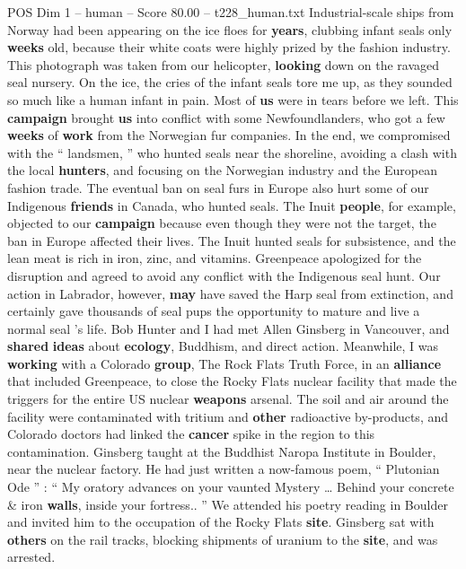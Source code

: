 \begin{textsample}{POS Dim 1 – human – Score 80.00 – t228\_human.txt}
Industrial-scale ships from Norway had been appearing on the ice floes for \textbf{years}, clubbing infant seals only \textbf{weeks} old, because their white coats were highly prized by the fashion industry.
This photograph was taken from our helicopter, \textbf{looking} down on the ravaged seal nursery.
On the ice, the cries of the infant seals tore me up, as they sounded so much like a human infant in pain.
Most of \textbf{us} were in tears before we left.
This \textbf{campaign} brought \textbf{us} into conflict with some Newfoundlanders, who got a few \textbf{weeks} of \textbf{work} from the Norwegian fur companies.
In the end, we compromised with the “ landsmen, ” who hunted seals near the shoreline, avoiding a clash with the local \textbf{hunters}, and focusing on the Norwegian industry and the European fashion trade.
The eventual ban on seal furs in Europe also hurt some of our Indigenous \textbf{friends} in Canada, who hunted seals.
The Inuit \textbf{people}, for example, objected to our \textbf{campaign} because even though they were not the target, the ban in Europe affected their lives.
The Inuit hunted seals for subsistence, and the lean meat is rich in iron, zinc, and vitamins.
Greenpeace apologized for the disruption and agreed to avoid any conflict with the Indigenous seal hunt.
Our action in Labrador, however, \textbf{may} have saved the Harp seal from extinction, and certainly gave thousands of seal pups the opportunity to mature and live a normal seal ’s life.
Bob Hunter and I had met Allen Ginsberg in Vancouver, and \textbf{shared} \textbf{ideas} about \textbf{ecology}, Buddhism, and direct action.
Meanwhile, I was \textbf{working} with a Colorado \textbf{group}, The Rock Flats Truth Force, in an \textbf{alliance} that included Greenpeace, to close the Rocky Flats nuclear facility that made the triggers for the entire US nuclear \textbf{weapons} arsenal.
The soil and air around the facility were contaminated with tritium and \textbf{other} radioactive by-products, and Colorado doctors had linked the \textbf{cancer} spike in the region to this contamination.
Ginsberg taught at the Buddhist Naropa Institute in Boulder, near the nuclear factory.
He had just written a now-famous poem, “ Plutonian Ode ” : “ My oratory advances on your vaunted Mystery … Behind your concrete \& iron \textbf{walls}, inside your fortress.. ” We attended his poetry reading in Boulder and invited him to the occupation of the Rocky Flats \textbf{site}.
Ginsberg sat with \textbf{others} on the rail tracks, blocking shipments of uranium to the \textbf{site}, and was arrested.

\end{textsample}
